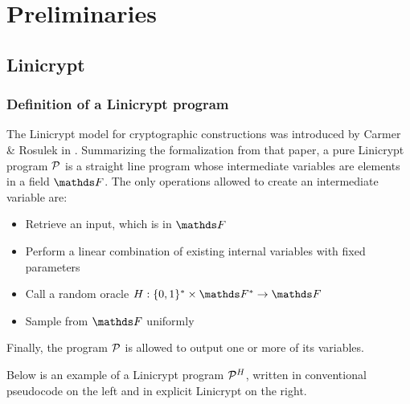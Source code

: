 \chapter{Preliminaries}

\section{Linicrypt}
\subsection{Definition of a Linicrypt program}

The Linicrypt model for cryptographic constructions was introduced by Carmer \& Rosulek in \cite{C:CarRos16}.
Summarizing the formalization from that paper,
a pure Linicrypt program $\P$ is a straight line program
whose intermediate variables are elements in a field $\F$.
The only operations allowed to create an intermediate variable are:
\begin{itemize}
  \item Retrieve an input, which is in $\F$
  \item Perform a linear combination of existing internal variables with fixed parameters
  \item Call a random oracle $\H: \{0,1\}^* \times \F^* \to \F$
  \item Sample from $\F$ uniformly
\end{itemize}
Finally, the program $\P$ is allowed to output one or more of its variables.

Below is an example of a Linicrypt program $\P^\H$,
written in conventional pseudocode on the left and in explicit Linicrypt on the right. 

\begin{pchstack}[center, space=0.4cm]
  \pseudocode[valign=c]{\rightsquigarrow}
\end{pchstack}

